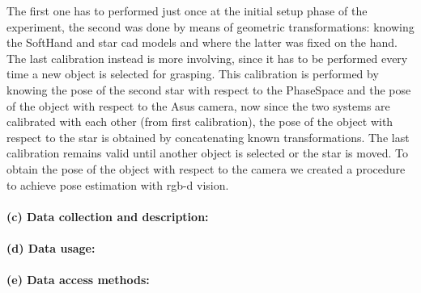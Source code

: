 The first one has to performed just once at the initial setup phase of the experiment, the second was done by means of geometric transformations: knowing the SoftHand and star cad models and where the latter was fixed on the hand.
The last calibration instead is more involving, since it has to be performed every time a new object is selected for grasping. This calibration is performed by knowing the pose of the second star with respect to the PhaseSpace and the
pose of the object with respect to the Asus camera, now since the two systems are calibrated with each other (from first calibration), the pose of the object with respect to the star is obtained by concatenating known transformations.
The last calibration remains valid until another object is selected or the star is moved.
To obtain the pose of the object with respect to the camera we created a procedure to achieve pose estimation with rgb-d vision.


\paragraph{(c) Data collection and description:}
\paragraph{(d) Data usage:}
\paragraph{(e) Data access methods:}




